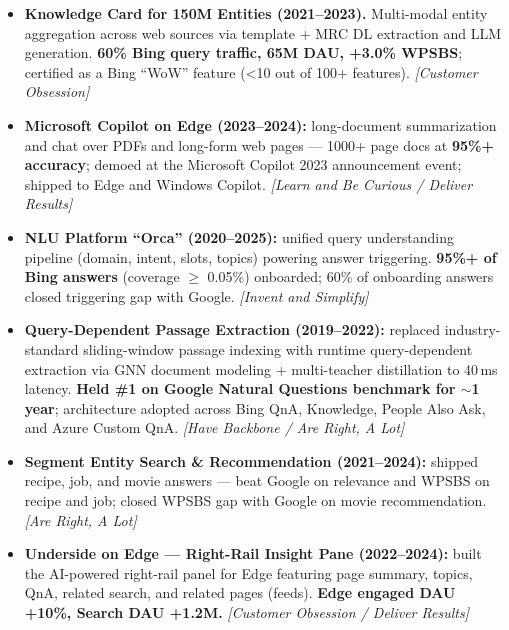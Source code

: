 \documentclass[10.5pt,letterpaper]{article}
\newcommand{\lp}[1]{\textcolor{blue!55!black}{\small\textit{[#1]}}}
\begin{document}
\begin{itemize}
  \item \textbf{Knowledge Card for 150M Entities (2021--2023).} Multi-modal entity aggregation across web sources via template + MRC DL extraction and LLM generation. \textbf{60\% Bing query traffic, 65M DAU, +3.0\% WPSBS}; certified as a Bing ``WoW'' feature (<10 out of 100+ features). \lp{Customer Obsession}
  \item \textbf{Microsoft Copilot on Edge (2023--2024):} long-document summarization and chat over PDFs and long-form web pages --- 1000+ page docs at \textbf{95\%+ accuracy}; demoed at the Microsoft Copilot 2023 announcement event; shipped to Edge and Windows Copilot. \lp{Learn and Be Curious / Deliver Results}
  \item \textbf{NLU Platform ``Orca'' (2020--2025):} unified query understanding pipeline (domain, intent, slots, topics) powering answer triggering. \textbf{95\%+ of Bing answers} (coverage $\ge$ 0.05\%) onboarded; 60\% of onboarding answers closed triggering gap with Google. \lp{Invent and Simplify}
  \item \textbf{Query-Dependent Passage Extraction (2019--2022):} replaced industry-standard sliding-window passage indexing with runtime query-dependent extraction via GNN document modeling + multi-teacher distillation to 40\,ms latency. \textbf{Held \#1 on Google Natural Questions benchmark for $\sim$1 year}; architecture adopted across Bing QnA, Knowledge, People Also Ask, and Azure Custom QnA. \lp{Have Backbone / Are Right, A Lot}
  \item \textbf{Segment Entity Search \& Recommendation (2021--2024):} shipped recipe, job, and movie answers --- beat Google on relevance and WPSBS on recipe and job; closed WPSBS gap with Google on movie recommendation. \lp{Are Right, A Lot}
  \item \textbf{Underside on Edge --- Right-Rail Insight Pane (2022--2024):} built the AI-powered right-rail panel for Edge featuring page summary, topics, QnA, related search, and related pages (feeds). \textbf{Edge engaged DAU +10\%, Search DAU +1.2M.} \lp{Customer Obsession / Deliver Results}
\end{itemize}

\end{document}
